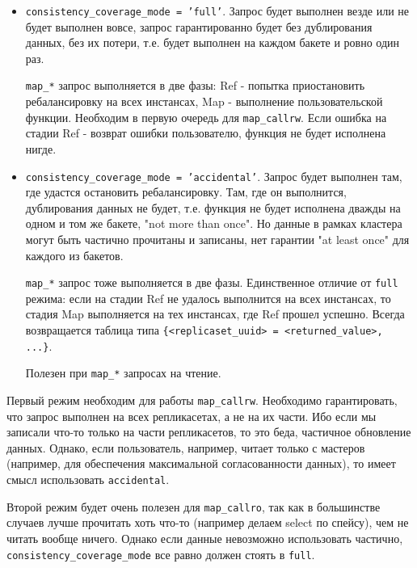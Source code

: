 \begin{itemize}
    \item \texttt{consistency\_coverage\_mode = 'full'}. Запрос будет выполнен
        везде или не будет выполнен вовсе, запрос гарантированно будет без
        дублирования данных, без их потери, т.е. будет выполнен на каждом
        бакете и ровно один раз.

    \texttt{map\_*} запрос выполняется в две фазы: Ref - попытка приостановить
        ребалансировку на всех инстансах, Map - выполнение пользовательской
        функции. Необходим в первую очередь для \texttt{map\_callrw}. Если
        ошибка на стадии Ref - возврат ошибки пользователю, функция не будет
        исполнена нигде.

    \item \texttt{consistency\_coverage\_mode = 'accidental'}. Запрос будет
        выполнен там, где удастся остановить ребалансировку. Там, где он
        выполнится, дублирования данных не будет, т.е. функция не будет
        исполнена дважды на одном и том же бакете, "not more than once". Но
        данные в рамках кластера могут быть частично прочитаны и записаны, нет
        гарантии "at least once" для каждого из бакетов.

    \texttt{map\_*} запрос тоже выполняется в две фазы. Единственное отличие от
        \texttt{full} режима: если на стадии Ref не удалось выполнится на всех
        инстансах, то стадия Map выполняется на тех инстансах, где Ref прошел
        успешно. Всегда возвращается таблица типа \texttt{\{<replicaset\_uuid>
        = <returned\_value>, ...\}}.

    Полезен при \texttt{map\_*} запросах на чтение.
\end{itemize}

Первый режим необходим для работы \texttt{map\_callrw}. Необходимо
гарантировать, что запрос выполнен на всех репликасетах, а не на их части. Ибо
если мы записали что-то только на части репликасетов, то это беда, частичное
обновление данных. Однако, если пользователь, например, читает только с
мастеров (например, для обеспечения максимальной согласованности данных), то
имеет смысл использовать \texttt{accidental}.

Второй режим будет очень полезен для \texttt{map\_callro}, так как в
большинстве случаев лучше прочитать хоть что-то (например делаем select по
спейсу), чем не читать вообще ничего. Однако если данные невозможно
использовать частично, \texttt{consistency\_coverage\_mode} все равно должен
стоять в \texttt{full}.

